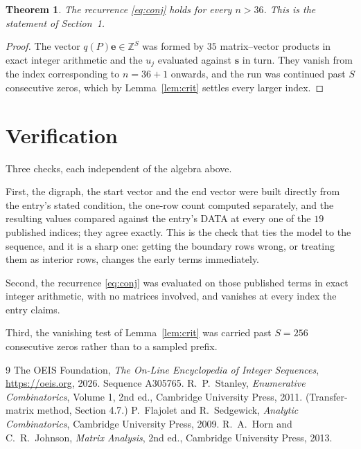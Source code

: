 \documentclass[11pt,a4paper]{article}
\theoremstyle{plain}
\newtheorem{theorem}{Theorem}
\theoremstyle{definition}
\begin{document}
\begin{theorem}
The recurrence \eqref{eq:conj} holds for every $n>36$. This is the statement of
Section~1.
\end{theorem}

\begin{proof}
The vector $q(P)\mathbf{e}\in\mathbb{Z}^{S}$ was formed by $35$ matrix--vector
products in exact integer arithmetic and the $u_j$ evaluated against $\mathbf{s}$ in turn.
They vanish from the index corresponding to $n=36+1$ onwards, and the run was continued
past $S$ consecutive zeros, which by Lemma~\ref{lem:crit} settles every larger index.
\end{proof}

\section{Verification}

Three checks, each independent of the algebra above.

First, the digraph, the start vector and the end vector were built directly from the
entry's stated condition, the one-row count computed separately, and the resulting values
compared against the entry's DATA at every one of the $19$ published indices; they
agree exactly. This is the check that ties the model to the sequence, and it is a sharp one:
getting the boundary rows wrong, or treating them as interior rows, changes the early terms
immediately.

Second, the recurrence \eqref{eq:conj} was evaluated on those published terms in exact
integer arithmetic, with no matrices involved, and vanishes at every index the entry claims.

Third, the vanishing test of Lemma~\ref{lem:crit} was carried past $S=256$ consecutive
zeros rather than to a sampled prefix.

\begin{thebibliography}{9}
 The OEIS Foundation, \emph{The On-Line Encyclopedia of Integer
Sequences}, \url{https://oeis.org}, 2026. Sequence A305765.
 R.~P.~Stanley, \emph{Enumerative Combinatorics}, Volume 1, 2nd ed.,
Cambridge University Press, 2011. (Transfer-matrix method, Section 4.7.)
 P.~Flajolet and R.~Sedgewick, \emph{Analytic Combinatorics}, Cambridge
University Press, 2009.
 R.~A.~Horn and C.~R.~Johnson, \emph{Matrix Analysis}, 2nd ed., Cambridge
University Press, 2013.
\end{thebibliography}
\end{document}
